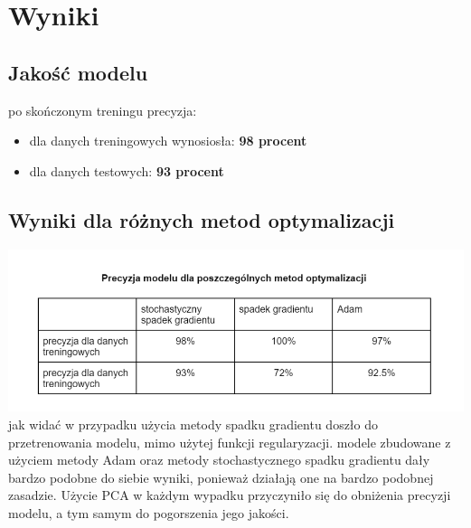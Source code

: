 \documentclass[a4paper,12pt]{scrartcl}
\begin{document}
\section{Wyniki}
\subsection{Jakość modelu}
po skończonym treningu precyzja:
\begin{itemize}
\item dla danych treningowych wynosiosła: \textbf{98 procent}
\item dla danych testowych: \textbf{93 procent}
\end{itemize}  

\subsection{Wyniki dla różnych metod optymalizacji}
\includegraphics[width=\linewidth]{precpng.png}
jak widać w przypadku użycia metody spadku gradientu doszło do przetrenowania modelu,
mimo użytej funkcji regularyzacji.
modele zbudowane z użyciem metody Adam oraz 
metody stochastycznego spadku gradientu dały bardzo podobne do siebie wyniki,
ponieważ działają one na bardzo podobnej zasadzie. 
Użycie PCA w każdym wypadku przyczyniło się do obniżenia precyzji modelu, a tym samym do pogorszenia jego jakości.
\end{document}
